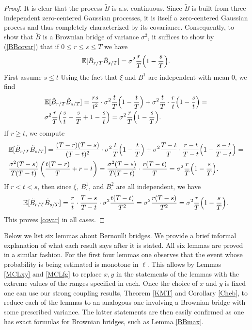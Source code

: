 \begin{proof}
	It is clear that the process $\tilde{B}$ is a.s. continuous. Since $\tilde{B}$ is built from three independent zero-centered Gaussian processes, it is itself a zero-centered Gaussian process and thus completely characterized by its covariance. Consequently, to show that $\tilde{B}$ is a Brownian bridge of variance $\sigma^2$, it suffices to show by (\ref{BBcovar}) that if $0\leq r\leq s\leq T$ we have
	\begin{equation}\label{covar}
	\mathbb{E}[\tilde{B}_{r/T}\tilde{B}_{s/T}] = \sigma^2 \frac{r}{T}\Big(1-\frac{s}{T}\Big).
	\end{equation}
	First assume $s\leq t$ Using the fact that $\xi$ and $B^1_\cdot$ are independent with mean 0, we find
	\begin{equation*}
	\begin{split}
	&\mathbb{E}[\tilde{B}_{r/T}\tilde{B}_{s/T}] = \frac{rs}{t^2}\cdot\sigma^2\frac{t}{T}\Big(1-\frac{t}{T}\Big) + \sigma^2\frac{t}{T}\cdot\frac{r}{t}\Big(1-\frac{s}{t}\Big) =\\
	&\sigma^2\frac{r}{T}\Big(\frac{s}{t} - \frac{s}{T} + 1 - \frac{s}{t}\Big) = \sigma^2\frac{r}{T}\Big(1-\frac{s}{T}\Big).
	\end{split}
	\end{equation*}
	If $r\geq t$, we compute
	\begin{equation*}
	\begin{split}
	&\mathbb{E}[\tilde{B}_{r/T}\tilde{B}_{s/T}] = \frac{(T-r)(T-s)}{(T-t)^2}\cdot\sigma^2\frac{t}{T}\Big( 1 - \frac{t}{T}\Big) + \sigma^2\frac{T-t}{T}\cdot\frac{r-t}{T-t}\Big( 1 - \frac{s-t}{T-t}\Big) =\\
	&\frac{\sigma^2(T-s)}{T(T-t)}\left(\frac{t(T-r)}{T} + r-t\right) = \frac{\sigma^2(T-s)}{T(T-t)}\cdot\frac{r(T-t)}{T} = \sigma^2\frac{r}{T}\Big(1-\frac{s}{T}\Big).
	\end{split}
	\end{equation*}
	If $r < t < s$, then since $\xi$, $B^1_\cdot$, and $B^2_\cdot$ are all independent, we have
	\[
	\mathbb{E}[\tilde{B}_{r/T}\tilde{B}_{s/T}] = \frac{r}{t}\cdot\frac{T-s}{T-t}\cdot\sigma^2\frac{t(T-t)}{T^2} = \sigma^2\frac{r(T-s)}{T^2} = \sigma^2\frac{r}{T}\Big(1-\frac{s}{T}\Big).
	\]
	This proves \eqref{covar} in all cases.
\end{proof}

Below we list six lemmas about Bernoulli bridges. We provide a brief informal explanation of what each result says after it is stated. All six lemmas are proved in a similar fashion. For the first four lemmas one observes that the event whose probability is being estimated is monotone in $\ell$. This allows by Lemmas \ref{MCLxy} and \ref{MCLfg} to replace $x,y$ in the statements of the lemmas with the extreme values of the ranges specified in each. Once the choice of $x$ and $y$ is fixed one can use our strong coupling results, Theorem \ref{KMT} and Corollary \ref{Cheb}, to reduce each of the lemmas to an analogous one involving a Brownian bridge with some prescribed variance. The latter statements are then easily confirmed as one has exact formulas for Brownian bridges, such as Lemma \ref{BBmax}.\\

